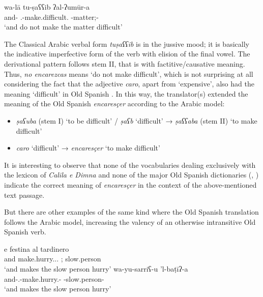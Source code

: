 \documentclass[output=paper]{langscibook}
\begin{document}
\begin{exe}
    \ex\label{doehla:ex:7}
    \gll wa-lā tu-ṣaʕʕib ʔal-ʔumūr-a \\
    and-\NEG{} \Second\SG.\M-make.difficult.\JUS{} \Def-matter;\PL-\ACC{} \\
    \glt‘and do not make the matter difficult’ \citep[fo. 48v]{azzam_kitab_1941}
\end{exe}


The Classical Arabic verbal form \textit{tuṣaʕʕib} is in the jussive mood; it is basically the indicative imperfective form of the verb with elision of the final vowel. The derivational pattern follows stem II, that is with factitive/causative meaning. Thus, \textit{no encarezcas} means ‘do not make difficult’, which is not surprising at all considering the fact that the adjective \textit{caro}, apart from ‘expensive’, also had the meaning ‘difficult’ in Old Spanish \citep[138]{kasten_tentative_2001}. In this way, the translator(s) extended the meaning of the Old Spanish \textit{encaresçer} according to the Arabic model: 
\begin{itemize}
\item[]\textit{ṣaʕuba} (stem I) ‘to be difficult’ / \textit{ṣaʕb} ‘difficult’ → \textit{ṣaʕʕaba} (stem II) ‘to make difficult’
\item[]\textit{caro} ‘difficult’ → \textit{encaresçer} ‘to make difficult’
\end{itemize}

It is interesting to observe that none of the vocabularies dealing exclusively with the lexicon of \textit{Calila e Dimna} \citep{holmes_etymological_1936,perez_vocabulario_1943, stinson_etymological_1967} and none of the major Old Spanish dictionaries (\citealt{alonso_diccionario_1996}, \citealt{kasten_tentative_2001}) indicate the correct meaning of \textit{encaresçer} in the context of the above-mentioned text passage. 

But there are other examples of the same kind where the Old Spanish translation follows the Arabic model, increasing the valency of an otherwise intransitive Old Spanish verb.

\begin{exe}
    \ex
    \begin{xlist}
        \ex\label{doehla:ex:8a}
        \gll e festina al tardinero \\
        and make.hurry.\Third\SG.\PRS.\IND{} \OBJ;\Def{} slow.person \\
        \glt ‘and makes the slow person hurry’ \citep[I.174t]{dohla_libro_2009}
        \ex\label{doehla:ex:8b}
        \gll wa-yu-sarriʕ-u 'l-baṭīʔ-a \\
        and-\Third\SG.\M-make.hurry.\IPFV-\IND{} \Def-slow.person-\ACC{} \\
        \glt ‘and makes the slow person hurry’ \citep[fo. 49r]{ibn_al-muqaffa_kitab_nodate}
    \end{xlist}
\end{exe}
\end{document}
